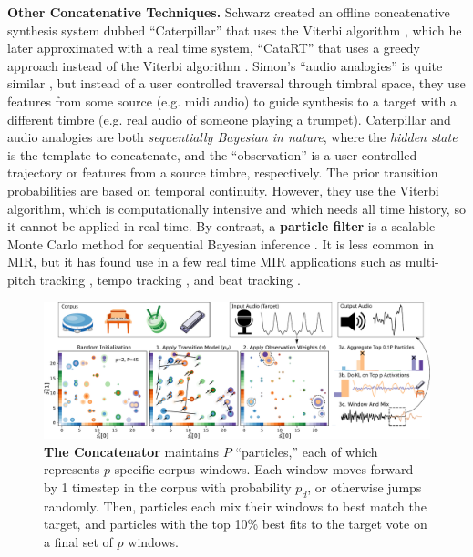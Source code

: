 \documentclass{article}
\begin{document}
\textbf{Other Concatenative Techniques.} Schwarz created an offline concatenative synthesis system dubbed ``Caterpillar'' that uses the Viterbi algorithm \cite{schwarz2000system}, which he later approximated with a real time system, ``CataRT'' that uses a greedy approach instead of the Viterbi algorithm \cite{schwarz2006real, schwarz2008principles}.  Simon's ``audio analogies'' is quite similar \cite{simon2005audio}, but instead of a user controlled traversal through timbral space, they use features from some source (e.g. midi audio) to guide synthesis to a target with a different timbre (e.g. real audio of someone playing a trumpet). Caterpillar and audio analogies are both {\em sequentially Bayesian in nature}, where the {\em hidden state} is the template to concatenate, and the ``observation'' is a user-controlled trajectory or features from a source timbre, respectively.  The prior transition probabilities are based on temporal continuity.  However, they use the Viterbi algorithm, which is computationally intensive and which needs all time history, so it cannot be applied in real time.  By contrast, a \textbf{particle filter} is a scalable Monte Carlo method for sequential Bayesian inference \cite{metropolis1949monte, doucet2000sequential, thrun2002probabilistic}.  It is less common in MIR, but it has found use in a few real time MIR applications such as multi-pitch tracking \cite{duan2011state}, tempo tracking \cite{cemgil2003monte, hainsworth2004particle}, and beat tracking \cite{heydari2021don}.  

\begin{figure}[h]
	\centering
	\includegraphics[width=\textwidth]{figs/BlockDGM.pdf}%
	\caption{\textbf{The Concatenator} maintains $P$ ``particles,'' each of which represents $p$ specific corpus windows.  Each window moves forward by 1 timestep in the corpus with probability $p_d$, or otherwise jumps randomly.  Then, particles each mix their windows to best match the target, and particles with the top 10\% best fits to the target vote on a final set of $p$ windows.}
	\label{fig:BlockDGM}
\end{figure}
\end{document}

